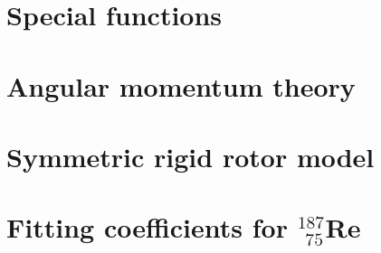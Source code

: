 \documentclass  [
  paper           = a4,
  BCOR            = 13mm, %
  twoside,
  fontsize        = 11pt, %
  DIV             = 12,   %
  chapterprefix,
  numbers         = noendperiod,
  headinclude     = true,
  footinclude     = false,
  headings        = big,
  headings        = openright,
  headsepline     = true,
  footsepline     = false,
  cleardoublepage = empty,
  titlepage       = true
]                                       {scrbook}
\begin{document}
  \section{Special functions\label{app:special_func}}
  	

  \section{Angular momentum theory \label{app:ang_theo}}
    
    
  \section{Symmetric rigid rotor model}
    
    
  \section{Fitting coefficients for $^{187}_{\;\,75}$Re\label{app:re187}}
    
      




  \cleardoublepage
  \backmatter

  
    
%    
%    
    \thispagestyle{plain}





  \cleardoublepage

  
    \thispagestyle{plain}


%  


%    
%    
\end{document}
